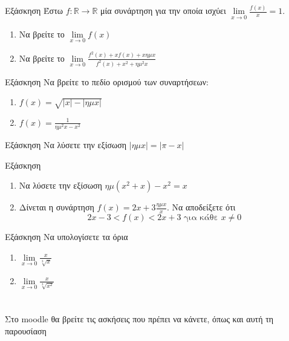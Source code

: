 \documentclass[greek]{beamer}
\begin{document}
\begin{frame}{Εξάσκηση}
 Έστω $f:\mathbb{R}\to\mathbb{R}$ μία συνάρτηση για την οποία ισχύει $\lim\limits_{x \to 0}{ \frac{f(x)}{x} }=1$.
 \begin{enumerate}
  \item Να βρείτε το $\lim\limits_{x \to 0}{f(x)}$ \pause
  \item Να βρείτε το $\lim\limits_{x \to 0}{\frac{f^2(x)+xf(x)+xημx}{f^2(x)+x^2+ημ^2x}}$
 \end{enumerate}
\end{frame}

\begin{frame}{Εξάσκηση}
 Να βρείτε το πεδίο ορισμού των συναρτήσεων:
 \begin{enumerate}
  \item $f(x)=\sqrt{|x|-|ημx|}$ \pause
  \item $f(x)=\frac{1}{ημ^2x-x^2}$
 \end{enumerate}
\end{frame}

\begin{frame}{Εξάσκηση}
 Να λύσετε την εξίσωση $|ημx|=|π-x|$
\end{frame}

\begin{frame}{Εξάσκηση}
 \begin{enumerate}
  \item Να λύσετε την εξίσωση $ημ(x^2+x)-x^2=x$ \pause
  \item Δίνεται η συνάρτηση $f(x)=2x+3\frac{ημx}{x}$. Να αποδείξετε ότι
        $$2x-3<f(x)<2x+3 \text{ για κάθε } x\ne 0$$
 \end{enumerate}
\end{frame}

\begin{frame}{Εξάσκηση}
 Να υπολογίσετε τα όρια
 \begin{enumerate}
  \item $\lim\limits_{x \to 0}{ \frac{x}{\sqrt[3]{x}} }$ \pause
  \item $\lim\limits_{x \to 0}{ \frac{x}{\sqrt[3]{x^2}} }$
 \end{enumerate}
\end{frame}

\section{}
\begin{frame}
 Στο moodle θα βρείτε τις ασκήσεις που πρέπει να κάνετε, όπως και αυτή τη παρουσίαση
\end{frame}
\end{document}
